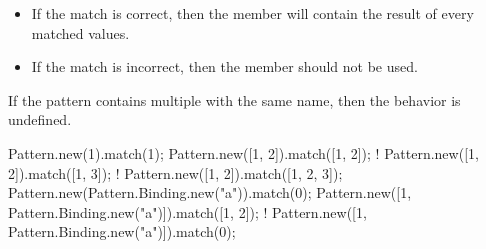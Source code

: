\begin{urbiscriptapi}
\begin{itemize}
\item If the match is correct, then the  member will
      contain the result of every matched values.
    \item If the match is incorrect, then the  member should
      not be used.
  \end{itemize}
  If the pattern contains multiple  with the same name,
  then the behavior is undefined.

\begin{urbiassert}
Pattern.new(1).match(1);
Pattern.new([1, 2]).match([1, 2]);
! Pattern.new([1, 2]).match([1, 3]);
! Pattern.new([1, 2]).match([1, 2, 3]);
Pattern.new(Pattern.Binding.new("a")).match(0);
Pattern.new([1, Pattern.Binding.new("a")]).match([1, 2]);
! Pattern.new([1, Pattern.Binding.new("a")]).match(0);
\end{urbiassert}
\end{urbiscriptapi}

